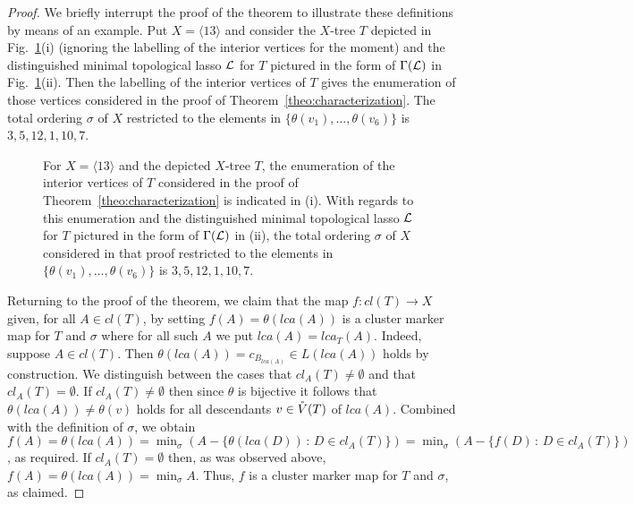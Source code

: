 \begin{proof}
  We briefly interrupt the proof of the theorem to illustrate these
  definitions by means of an example. Put $X=\langle 13\rangle$ and consider
  the $X$-tree $T$ depicted in Fig.~\ref{fig:illustration-main-theorem}(i)
  (ignoring the labelling of the interior vertices for the moment) and the
  distinguished minimal topological lasso ${\mathcal L}$ for $T$ pictured in the form
  of $\Gamma({\mathcal L})$ in Fig.~\ref{fig:illustration-main-theorem}(ii). Then the
  labelling of the interior vertices of $T$ gives the enumeration of those
  vertices considered in the proof of Theorem~\ref{theo:characterization}. The
  total ordering $\sigma$ of $X$ restricted to the elements in
  $\{\theta(v_1),\ldots, \theta(v_6)\}$ is $3,5,12,1,10,7$.

  \begin{figure}[h]
    \begin{center}
      
    \end{center}
    \caption{ For $X=\langle 13\rangle$ and the depicted $X$-tree $T$, the
      enumeration of the interior vertices of $T$ considered in the proof of
      Theorem~\ref{theo:characterization} is indicated in (i). With regards to
      this enumeration and the distinguished minimal topological lasso ${\mathcal L}$ for
      $T$ pictured in the form of $\Gamma({\mathcal L})$ in (ii), the total ordering
      $\sigma$ of $X$ considered in that proof restricted to the elements in
      $\{\theta(v_1),\ldots, \theta(v_6)\}$ is $3,5,12,1,10,7$.}
    \label{fig:illustration-main-theorem}
  \end{figure}

  Returning to the proof of the theorem, we claim that the map $f:cl(T)\to X$
  given, for all $A\in cl(T)$, by setting $f(A)=\theta(lca(A))$ is a cluster
  marker map for $T$ and $\sigma$ where for all such $A$ we put
  $lca(A)=lca_T(A)$. Indeed, suppose $A\in cl(T)$.  Then
  $\theta(lca(A))=c_{B_{lca(A)}}\in L(lca(A))$ holds by construction.  We
  distinguish between the cases that $cl_A(T)\not =\emptyset$ and that
  $cl_A(T)=\emptyset$. If $cl_A(T)\not =\emptyset$ then since $\theta$ is
  bijective it follows that $\theta(lca(A))\not=\theta(v)$ holds for all
  descendants $v\in \mathring{V}(T)$ of $lca(A)$.  Combined with the definition of
  $\sigma$, we obtain
  $f(A)=\theta(lca(A))=\min_{\sigma}(A-\{\theta(lca(D))\,:\, D\in cl_A(T)\})=
  \min_{\sigma}(A-\{f(D)\,:\, D\in cl_A(T)\})$, as required.  If
  $cl_A(T)=\emptyset$ then, as was observed above,
  $f(A)=\theta(lca(A))=\min_{\sigma}A$. Thus, $f$ is a cluster marker map for
  $T$ and $\sigma$, as claimed.


\end{proof}
